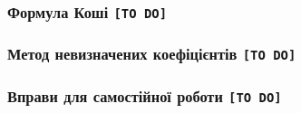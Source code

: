 \documentclass[a4paper, 12pt]{article}
\theoremstyle{definition}
\newcommand{\todo}{\texttt{[TO DO]}}
\numberwithin{equation}{section}%
\numberwithin{equation}{subsection}
\begin{document}


\subsubsection{Формула Коші \todo}



\subsubsection{Метод невизначених коефіцієнтів \todo}



\subsubsection{Вправи для самостійної роботи \todo}



\newpage

\nocite{*}




\end{document}
